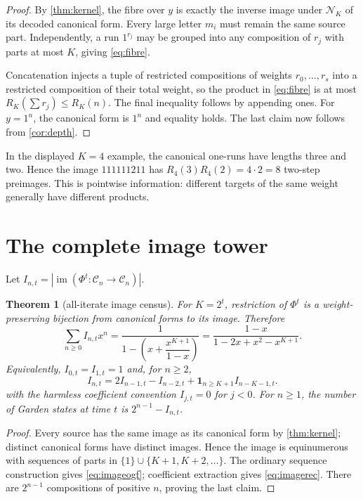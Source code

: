 \documentclass[10pt,a4paper]{amsart}
\newtheorem{theorem}{Theorem}[section]
\theoremstyle{definition}
\theoremstyle{remark}
\newcommand{\Comp}{\mathcal C}
\newcommand{\NF}{\mathcal N}
\newcommand{\im}{\operatorname{im}}
\begin{document}
\begin{proof}
By \cref{thm:kernel}, the fibre over $y$ is exactly the inverse image under
$\NF_K$ of its decoded canonical form.  Every large letter $m_i$ must
remain the same source part.  Independently, a run $1^{r_j}$ may be grouped
into any composition of $r_j$ with parts at most $K$, giving
\eqref{eq:fibre}.

Concatenation injects a tuple of restricted compositions of weights
$r_0,\ldots,r_s$ into a restricted composition of their total weight, so
the product in \eqref{eq:fibre} is at most
$R_K(\sum r_j)\leq R_K(n)$.  The final inequality follows by appending
ones.  For $y=1^n$, the canonical form is $1^n$ and equality holds.
The last claim now follows from \cref{cor:depth}.
\end{proof}

In the displayed $K=4$ example, the canonical one-runs have lengths three
and two.  Hence the image $111111211$ has
$R_4(3)R_4(2)=4\cdot2=8$ two-step preimages.  This is pointwise information:
different targets of the same weight generally have different products.

\section{The complete image tower}

Let $I_{n,t}=|\im(\Phi^t:\Comp_n\to\Comp_n)|$.

\begin{theorem}[all-iterate image census]\label{thm:image}
For $K=2^t$, restriction of $\Phi^t$ is a weight-preserving bijection
from canonical forms to its image.  Therefore
\begin{equation}
 \sum_{n\geq0} I_{n,t}x^n
 =\frac{1}{1-\left(x+\dfrac{x^{K+1}}{1-x}\right)}
 =\frac{1-x}{1-2x+x^2-x^{K+1}}.                          \label{eq:imageogf}
\end{equation}
Equivalently, $I_{0,t}=I_{1,t}=1$ and, for $n\geq2$,
\begin{equation}
 I_{n,t}=2I_{n-1,t}-I_{n-2,t}
          +\mathbf1_{n\geq K+1}I_{n-K-1,t}.              \label{eq:imagerec}
\end{equation}
with the harmless coefficient convention $I_{j,t}=0$ for $j<0$.
For $n\geq1$, the number of Garden states at time $t$ is
$2^{n-1}-I_{n,t}$.
\end{theorem}

\begin{proof}
Every source has the same image as its canonical form by
\cref{thm:kernel}; distinct canonical forms have distinct images.  Hence
the image is equinumerous with sequences of parts in
$\{1\}\cup\{K+1,K+2,\ldots\}$.  The ordinary sequence construction gives
\eqref{eq:imageogf}; coefficient extraction gives \eqref{eq:imagerec}.
There are $2^{n-1}$ compositions of positive $n$, proving the last claim.
\end{proof}
\end{document}

